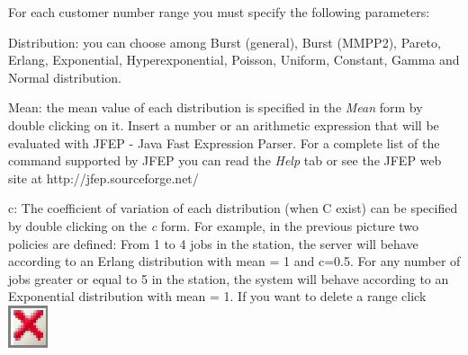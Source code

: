 For each customer number range you must specify the following parameters:
\begin{description*}
\item [Distribution:] you can choose among Burst (general), Burst
(MMPP2), Pareto, Erlang, Exponential, Hyperexponential, Poisson,
Uniform, Constant, Gamma and Normal distribution. \item [Mean:]
the mean value of each distribution is specified in the
\emph{Mean} form by double clicking on it. Insert a number or an
arithmetic expression that will be evaluated with JFEP - Java Fast
Expression Parser. For a complete list of the command supported by
JFEP you can read the \emph{Help} tab or see the JFEP web site at
http://jfep.sourceforge.net/ \item [c:] The coefficient of
variation of each distribution (when C exist) can be specified by
double clicking on the \emph{c} form. For example, in the previous
picture two policies are defined: From 1 to 4 jobs in the station,
the server will behave according to an Erlang distribution with
mean = 1 and c=0.5. For any number of jobs greater or equal to 5
in the station, the system will behave according to an Exponential
distribution with mean = 1. If you want to delete a range click
\includegraphics[scale=.5]{img/jsim/delete.eps}
\end{description*}

